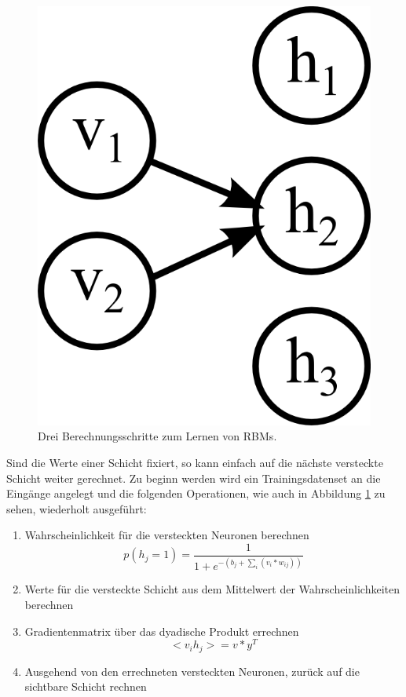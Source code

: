\begin{figure}
{\begin{minipage}{0.33\textwidth}
	\includegraphics[scale=1]{images/rbm-step3.png}\end{minipage}}
\label{fig:rbm-steps}
\caption{Drei Berechnungsschritte zum Lernen von RBMs.}
\label{fig:rbm-steps}
\end{figure}

Sind die Werte einer Schicht fixiert, so kann einfach auf die nächste versteckte Schicht weiter gerechnet. Zu beginn werden wird ein Trainingsdatenset an die Eingänge angelegt und die folgenden Operationen, wie auch in Abbildung \ref{fig:rbm-steps} zu sehen, wiederholt ausgeführt:

\begin{enumerate}
\item Wahrscheinlichkeit für die versteckten Neuronen berechnen $$p(h_j=1) = \frac{1}{1+e^{-(b_j+\sum_{i}(v_i*w_{ij}))}}$$
\item Werte für die versteckte Schicht aus dem Mittelwert der Wahrscheinlichkeiten berechnen
\item Gradientenmatrix über das dyadische Produkt errechnen $$<v_ih_j> = v*y^T$$
\item Ausgehend von den errechneten versteckten Neuronen, zurück auf die sichtbare Schicht rechnen
\end{enumerate}

